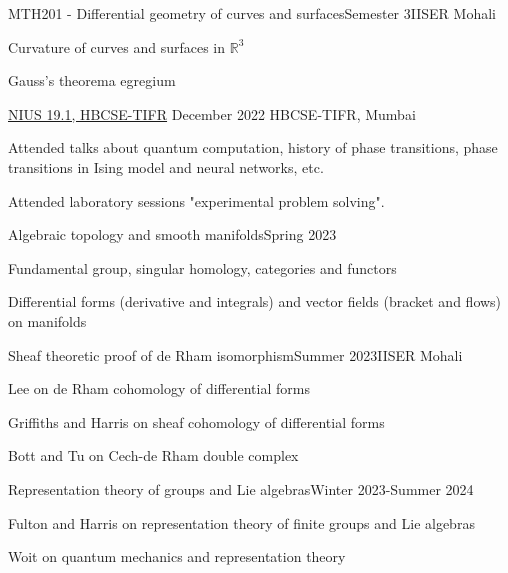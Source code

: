 \documentclass{LoLaTeXcv}
\begin{document}
\begin{lltxJob}{MTH201 - Differential geometry of curves and surfaces}{Semester 3}{IISER Mohali}
	\item Curvature of curves and surfaces in $\mathbb{R}^3$
	\item Gauss's theorema egregium
\end{lltxJob}

\begin{lltxJob}{
		\href{https://rupadarshiray.github.io/academicmatters/NIUS-19.1/NIUS-19.1-36-Rupadarshi-Ray-certificate.pdf}{NIUS 19.1, HBCSE-TIFR}}{
		December 2022}{
		HBCSE-TIFR, Mumbai}
	\item Attended talks about quantum computation, history of phase transitions, phase transitions in Ising model and neural networks, etc.
	\item Attended laboratory sessions "experimental problem solving".
\end{lltxJob}

\begin{lltxJob}{Algebraic topology and smooth manifolds}{Spring 2023}{}
	\item Fundamental group, singular homology, categories and functors
	\item Differential forms (derivative and integrals) and vector fields (bracket and flows) on manifolds
\end{lltxJob}

\begin{lltxJob}{Sheaf theoretic proof of de Rham isomorphism}{Summer 2023}{IISER Mohali}
	\item Lee on de Rham cohomology of differential forms
	\item Griffiths and Harris on sheaf cohomology of differential forms
	\item Bott and Tu on Cech-de Rham double complex
\end{lltxJob}


\begin{lltxJob}[Reading]{Representation theory of groups and Lie algebras}{Winter 2023-Summer 2024}{}
	\item Fulton and Harris on representation theory of finite groups and Lie algebras
	\item Woit on quantum mechanics and representation theory
\end{lltxJob}
\end{document}
